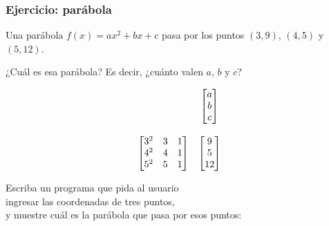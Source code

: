 \documentclass[12pt]{beamer}
\begin{document}
  \begin{frame}
    \label{ejercicio-parabola}
    \frametitle{Ejercicio: parábola}
    Una parábola \(f(x) = ax^2 + bx + c\)
    pasa por los puntos
    \((3, 9)\), \((4, 5)\) y \((5, 12)\).
    \vspace{2ex}

    ¿Cuál es esa parábola? Es decir,
    ¿cuánto valen \(a\), \(b\) y \(c\)?

    \pause
    \[
      \begin{array}{cc}
        &
        \begin{bmatrix} a \\ b \\ c \\ \end{bmatrix} \vspace{3ex} \\
        \begin{bmatrix}
          3^2 & 3 & 1 \\
          4^2 & 4 & 1 \\
          5^2 & 5 & 1 \\
        \end{bmatrix} &
        \begin{bmatrix} 9 \\ 5 \\ 12  \\ \end{bmatrix}
      \end{array}
    \]

  \end{frame}

  \begin{frame}
    \label{problema-parabola}
    Escriba un programa que pida al usuario \\
    ingresar las coordenadas de tres puntos, \\
    y muestre cuál es la parábola que pasa por esos puntos:
    
  \end{frame}
\end{document}
